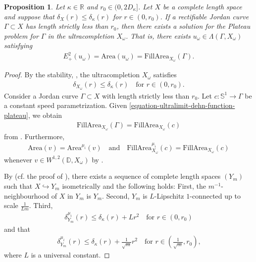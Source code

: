 \documentclass[a4paper,leqno]{amsart}
\numberwithin{equation}{section}
\newtheorem{proposition}[theorem]{Proposition}
\theoremstyle{remark}
\theoremstyle{remark}
\newcommand{\R}{\mathbb{R}}
\begin{document}
\begin{proposition}\label{proposition-existence-of-Plateau-problem}
Let $\kappa \in \R$ and $r_0 \in (0,2D_\kappa]$. Let $X$ be a complete length space and suppose that $\delta_{X}(r) \leq \delta_{\kappa}(r)$ for $r \in (0,r_0)$. If a rectifiable Jordan curve $\Gamma \subset X$ has length strictly less than $r_0$, then there exists a solution for the Plateau problem for $\Gamma$ in the ultracompletion $X_\omega$. That is, there exists $u_\omega \in \Lambda( \Gamma, X_\omega )$ satisfying
\begin{align*}
    E^{2}_{+}( u_\omega ) = \mathrm{Area}( u_\omega ) = \mathrm{FillArea}_{X_\omega}( \Gamma ).
\end{align*}
\end{proposition}
\begin{proof}
By the stability, , the ultracompletion $X_\omega$ satisfies
\begin{align}\label{equation-ultralimit-dehn-function-plateau}
    \delta_{X_\omega}(r) \leq \delta_\kappa(r) \quad\text{for $r \in (0,r_0)$.}
\end{align}
Consider a Jordan curve $\Gamma \subset X$ with length strictly less than $r_0$. Let $c \colon \mathbb{S}^1 \to \Gamma$ be a constant speed parametrization. Given \eqref{equation-ultralimit-dehn-function-plateau}, we obtain
\begin{align*}
    \mathrm{FillArea}_{X_\omega}( \Gamma ) = \mathrm{FillArea}_{X_\omega}( c )
\end{align*}
from \cite[Lemma 4.8]{Lyt:Wen:18:intrinsic}. Furthermore,
\begin{align*}
    \mathrm{Area}(v)
    =
    \mathrm{Area}^{\mu_i}(v)
    \quad\text{and}\quad
    \mathrm{FillArea}^{\mu_i}_{X_\omega}(c) = \mathrm{FillArea}_{X_\omega}(c)
\end{align*}
whenever $v \in W^{1,2}( \mathbb{D}, X_\omega )$ by . 
    
By \cite[Proposition 4.1]{stadler-wenger-2025-isoperimetric-inequalities-vs-upper-curvature-bounds} (cf. the proof of \cite[Proposition 3.5]{Lyt:Wen:You:20}), there exists a sequence of complete length spaces $( Y_m )$ such that $X \hookrightarrow Y_m$ isometrically and the following holds: First, the $m^{-1}$-neighbourhood of $X$ in $Y_m$ is $Y_m$. Second, $Y_m$ is $L$-Lipschitz $1$-connected up to scale $\frac{ 1 }{ L m }$. Third,
\begin{align*}
    \delta^{ \mu_i }_{ Y_m }(r) \leq \delta_{\kappa}(r) + L r^2 \quad\text{for $r \in (0, r_0)$}
\end{align*}
and that
\begin{align*}
    \delta^{ \mu_i }_{ Y_m }(r) \leq \delta_{\kappa}(r) + \frac{ 1 }{ \sqrt{m} } r^2 \quad\text{for $r \in \left( \frac{1}{\sqrt{m}}, r_0 \right)$,}
\end{align*}
where $L$ is a universal constant.


\end{proof}
\end{document}
